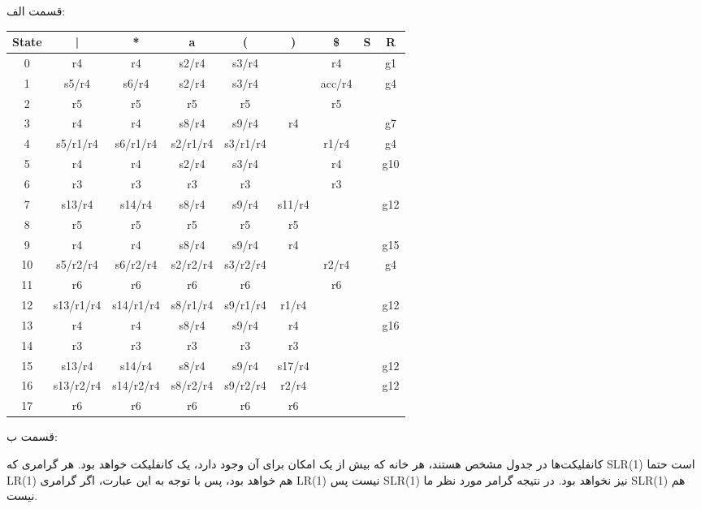 

قسمت الف:

\begin{center}
    \begin{latin}
    \begin{tabular}{|c|c|c|c|c|c|c|c|c|}
    \hline
    State  & |        & *        & a        & (        & )        & \$        & S        & R \\ \hline
    0      & r4       & r4       &s2/r4     &s3/r4     &          &r4         &          & g1\\ \hline
    1      &s5/r4     &s6/r4     &s2/r4     &s3/r4     &          &acc/r4     &          & g4\\ \hline
    2      &r5        &r5        &r5        &r5        &          &r5         &          &   \\ \hline
    3      &r4        &r4        &s8/r4     &s9/r4     &r4        &           &          & g7\\ \hline
    4      &s5/r1/r4  &s6/r1/r4  &s2/r1/r4  &s3/r1/r4  &          &r1/r4      &          & g4\\ \hline
    5      &r4        &r4        &s2/r4     &s3/r4     &          &r4         &          &g10\\ \hline
    6      &r3        &r3        &r3        &r3        &          &r3         &          &   \\ \hline
    7      &s13/r4    &s14/r4    &s8/r4     &s9/r4     &s11/r4    &           &          &g12\\ \hline
    8      &r5        &r5        &r5        &r5        &r5        &           &          &   \\ \hline
    9      &r4        &r4        &s8/r4     &s9/r4     &r4        &           &          &g15\\ \hline
    10     &s5/r2/r4  &s6/r2/r4  &s2/r2/r4  &s3/r2/r4  &          &r2/r4      &          & g4\\ \hline
    11     &r6        &r6        &r6        &r6        &          &r6         &          &   \\ \hline
    12     &s13/r1/r4 &s14/r1/r4 &s8/r1/r4  &s9/r1/r4  &r1/r4     &           &          &g12\\ \hline
    13     &r4        &r4        &s8/r4     &s9/r4     &r4        &           &          &g16\\ \hline
    14     &r3        &r3        &r3        &r3        &r3        &           &          &   \\ \hline
    15     &s13/r4    &s14/r4    &s8/r4     &s9/r4     &s17/r4    &           &          &g12\\ \hline
    16     &s13/r2/r4 &s14/r2/r4 &s8/r2/r4  &s9/r2/r4  &r2/r4     &           &          &g12\\ \hline
    17     &r6        &r6        &r6        &r6        &r6        &           &          &   \\ \hline
    \end{tabular}
    \end{latin}
\end{center}

قسمت ب:

کانفلیکت‌ها در جدول مشخص هستند، هر خانه که بیش از یک امکان برای آن وجود دارد، یک کانفلیکت خواهد بود.
هر گرامری که SLR(1) است حتما LR(1) هم خواهد بود، پس با توجه به این عبارت، اگر گرامری LR(1) نیست پس SLR(1) نیز نخواهد بود.
در نتیجه گرامر مورد نظر ما SLR(1) هم نیست.